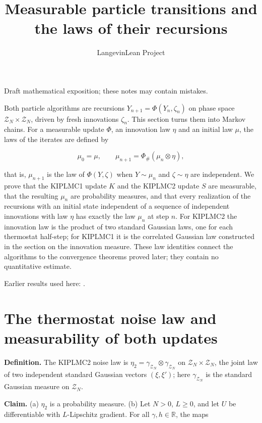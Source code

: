 \documentclass[11pt,a4paper]{article}
\title{\texorpdfstring{Measurable particle transitions and the laws of their recursions}{Measurable particle transitions and the laws of their recursions}}
\author{LangevinLean Project}
\date{}
\begin{document}
\maketitle
Draft mathematical exposition; these notes may contain mistakes.


Both particle algorithms are recursions \(Y_{n+1}=\Phi(Y_n,\zeta_n)\) on phase space \(\mathcal Z_N\times\mathcal Z_N\), driven by fresh innovations \(\zeta_n\). This section turns them into Markov chains. For a measurable update \(\Phi\), an innovation law \(\eta\) and an initial law \(\mu\), the laws of the iterates are defined by


\[\mu_0=\mu,\qquad\mu_{n+1}=\Phi_\#(\mu_n\otimes\eta),\]


that is, \(\mu_{n+1}\) is the law of \(\Phi(Y,\zeta)\) when \(Y\sim\mu_n\) and \(\zeta\sim\eta\) are independent. We prove that the KIPLMC1 update \(K\) and the KIPLMC2 update \(S\) are measurable, that the resulting \(\mu_n\) are probability measures, and that every realization of the recursions with an initial state independent of a sequence of independent innovations with law \(\eta\) has exactly the law \(\mu_n\) at step \(n\). For KIPLMC2 the innovation law is the product of two standard Gaussian laws, one for each thermostat half-step; for KIPLMC1 it is the correlated Gaussian law constructed in the section on the innovation measure. These law identities connect the algorithms to the convergence theorems proved later; they contain no quantitative estimate.



Earlier results used here: \cite[Section~3.33]{LangevinLean2026ULASC}.

\section{\texorpdfstring{The thermostat noise law and measurability of both updates}{The thermostat noise law and measurability of both updates}}


\textbf{Definition.} The KIPLMC2 noise law is \(\eta_2=\gamma_{\mathcal Z_N}\otimes\gamma_{\mathcal Z_N}\) on \(\mathcal Z_N\times\mathcal Z_N\), the joint law of two independent standard Gaussian vectors \((\xi,\xi')\); here \(\gamma_{\mathcal Z_N}\) is the standard Gaussian measure on \(\mathcal Z_N\).




\textbf{Claim.} (a) \(\eta_2\) is a probability measure. (b) Let \(N>0\), \(L\ge0\), and let \(U\) be differentiable with \(L\)-Lipschitz gradient. For all \(\gamma,h\in\mathbb R\), the maps
\end{document}
